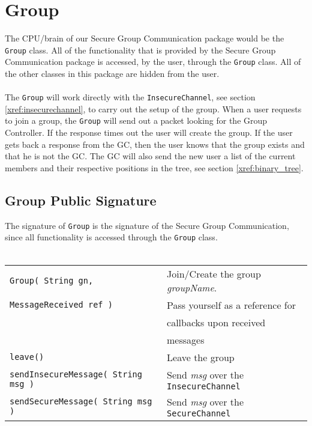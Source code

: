 \documentclass[12pt]{article}
\newcommand{\code}[1]{\texttt{#1}}
\begin{document}
    \section{Group}
    \label{xref:group}
     The CPU/brain of our Secure Group Communication package would 
     be the \code{Group} class.  All of the functionality that is provided by 
     the Secure Group Communication package is accessed, by the user, through 
     the \code{Group} class.  All of the other classes in this package
     are hidden from the user.\\
     \\
     The \code{Group} will work directly with the \code{InsecureChannel},
     see section \ref{xref:insecurechannel}, to carry out the setup
     of the group.  When a user requests to join a group, the \code{Group} will
     send out a packet looking for the Group Controller.  If the response times
     out the user will create the group.  If the user gets back a response
     from the GC, then the user knows that the group exists and that he is not 
     the GC.  The GC will also send the new user a list of the current members 
     and their respective positions in the tree, see section 
     \ref{xref:binary_tree}.

      \subsection{Group Public Signature}
      \label{xref:group_public_signature}
       The signature of \code{Group} is the signature of the Secure Group
       Communication, since all functionality is accessed through the 
       \code{Group} class.\\\\
	\begin{tabular} {ll}
	   \code{Group( String gn,} 
	     & Join/Create the group \textit{groupName}. \\
	   \hspace{.6in}\code{MessageReceived ref )} 
	     & \hspace{.3in} Pass yourself as a reference for \\
	     & \hspace{.3in} callbacks upon received \\
	     & \hspace{.3in} messages\\
	   \code{leave()} 
	     & Leave the group \\
	   \code{sendInsecureMessage( String msg )} 
	     & Send \textit{msg} over the \code{InsecureChannel} \\
	   \code{sendSecureMessage( String msg )} 
	     & Send \textit{msg} over the \code{SecureChannel} \\
	\end{tabular} 
\end{document}
